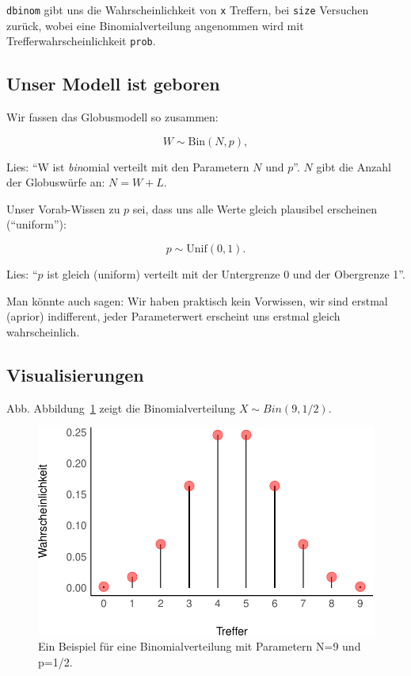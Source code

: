 \documentclass[
  a4paper,
  DIV=11]{scrreprt}
\theoremstyle{definition}
\theoremstyle{remark}
\begin{document}
\texttt{dbinom} gibt uns die Wahrscheinlichkeit von \texttt{x} Treffern,
bei \texttt{size} Versuchen zurück, wobei eine Binomialverteilung
angenommen wird mit Trefferwahrscheinlichkeit \texttt{prob}.

\hypertarget{unser-modell-ist-geboren}{%
\subsection{Unser Modell ist geboren}\label{unser-modell-ist-geboren}}

Wir fassen das Globusmodell so zusammen:

\[W \sim \text{Bin}(N,p),\]

Lies: ``W ist \emph{bin}omial verteilt mit den Parametern \(N\) und
\(p\)''. \(N\) gibt die Anzahl der Globuswürfe an: \(N=W+L\).

Unser Vorab-Wissen zu \(p\) sei, dass uns alle Werte gleich plausibel
erscheinen (``uniform''):

\[p \sim \text{Unif}(0,1).\]

Lies: ``\(p\) ist gleich (uniform) verteilt mit der Untergrenze 0 und
der Obergrenze 1''.

Man könnte auch sagen: Wir haben praktisch kein Vorwissen, wir sind
erstmal (aprior) indifferent, jeder Parameterwert erscheint uns erstmal
gleich wahrscheinlich.

\hypertarget{visualisierungen}{%
\subsection{Visualisierungen}\label{visualisierungen}}

Abb. Abbildung~\ref{fig-bin} zeigt die Binomialverteilung
\(X \sim Bin(9, 1/2)\).

\begin{figure}

{\centering \includegraphics{./Globusversuch_files/figure-pdf/fig-bin-1.pdf}

}

\caption{\label{fig-bin}Ein Beispiel für eine Binomialverteilung mit
Parametern N=9 und p=1/2.}

\end{figure}
\end{document}
